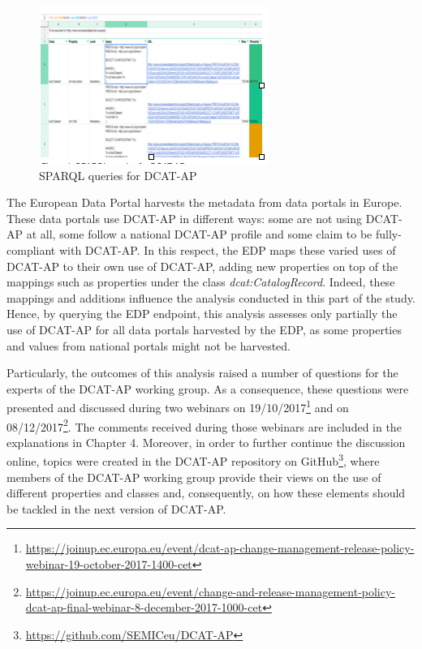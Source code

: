 \documentclass[<options>]{elsarticle}
\begin{document}
\begin{figure}[H]
\includegraphics[]{replace1.png}
\caption{SPARQL queries for DCAT-AP}
\end{figure}

The European Data Portal harvests the metadata from data portals in Europe. These data portals use DCAT-AP in different ways: some are not using DCAT-AP at all, some follow a national DCAT-AP profile and some claim to be fully-compliant with DCAT-AP. In this respect, the EDP maps these varied uses of DCAT-AP to their own use of DCAT-AP, adding new properties on top of the mappings such as properties under the class \textit{dcat:CatalogRecord}. Indeed, these mappings and additions influence the analysis conducted in this part of the study. Hence, by querying the EDP endpoint, this analysis assesses only partially the use of DCAT-AP for all data portals harvested by the EDP, as some properties and values from national portals might not be harvested.

Particularly, the outcomes of this analysis raised a number of questions for the experts of the DCAT-AP working group. As a consequence, these questions were presented and discussed during two webinars on 19/10/2017\footnote{\href{ https://joinup.ec.europa.eu/event/dcat-ap-change-management-release-policy-webinar-19-october-2017-1400-cet}{ https://joinup.ec.europa.eu/event/dcat-ap-change-management-release-policy-webinar-19-october-2017-1400-cet}} and on 08/12/2017\footnote{\href{ https://joinup.ec.europa.eu/event/change-and-release-management-policy-dcat-ap-final-webinar-8-december-2017-1000-cet}{ https://joinup.ec.europa.eu/event/change-and-release-management-policy-dcat-ap-final-webinar-8-december-2017-1000-cet}}. The comments received during those webinars are included in the explanations in Chapter 4. Moreover, in order to further continue the discussion online, topics were created in the DCAT-AP repository on GitHub\footnote{\href{  https://github.com/SEMICeu/DCAT-AP}{  https://github.com/SEMICeu/DCAT-AP}}, where members of the DCAT-AP working group provide their views on the use of different properties and classes and, consequently, on how these elements should be tackled in the next version of DCAT-AP.
\end{document}
